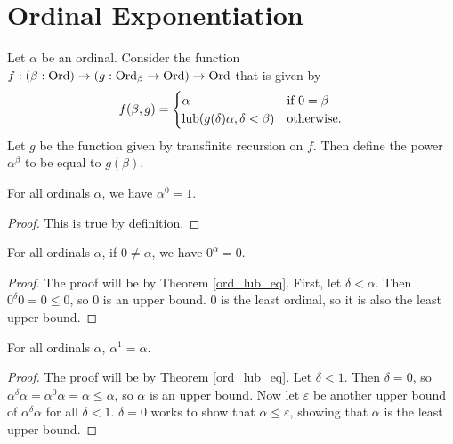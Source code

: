 \documentclass[../../math.tex]{subfiles}
\begin{document}
\section{Ordinal Exponentiation}

\begin{definition}
    Let $\alpha$ be an ordinal.  Consider the function $f : (\beta : \operatorname{Ord}) \to
    (g : \operatorname{Ord}_\beta \to \operatorname{Ord}) \to \operatorname{Ord}$ that is given by
    \[
        f(\beta, g) = \begin{cases}
            \alpha & \text{if $0 = \beta$} \\
            \operatorname{lub}(g(\delta)\alpha, \delta < \beta) & \text{otherwise.}
        \end{cases}
    \]
    Let $g$ be the function given by transfinite recursion on $f$.  Then define
    the power $\alpha^\beta$ to be equal to $g(\beta)$.
\end{definition}

\begin{theorem} \label{ord_pow_zero}
    For all ordinals $\alpha$, we have $\alpha^0 = 1$.
\end{theorem}
\begin{proof}
    This is true by definition.
\end{proof}

\begin{theorem} \label{zero_ord_pow}
    For all ordinals $\alpha$, if $0 \neq \alpha$, we have $0 ^ \alpha = 0$.
\end{theorem}
\begin{proof}
    The proof will be by Theorem \ref{ord_lub_eq}.  First, let $\delta <
    \alpha$.  Then $0^\delta 0 = 0 \leq 0$, so $0$ is an upper bound.  $0$ is
    the least ordinal, so it is also the least upper bound.
\end{proof}

\begin{theorem} \label{ord_pow_one}
    For all ordinals $\alpha$, $\alpha^1 = \alpha$.
\end{theorem}
\begin{proof}
    The proof will be by Theorem \ref{ord_lub_eq}.  Let $\delta < 1$.  Then
    $\delta = 0$, so $\alpha^\delta \alpha = \alpha^0 \alpha = \alpha \leq
    \alpha$, so $\alpha$ is an upper bound.  Now let $\varepsilon$ be another
    upper bound of $\alpha^\delta \alpha$ for all $\delta < 1$.  $\delta = 0$
    works to show that $\alpha \leq \varepsilon$, showing that $\alpha$ is the
    least upper bound.
\end{proof}
\end{document}
